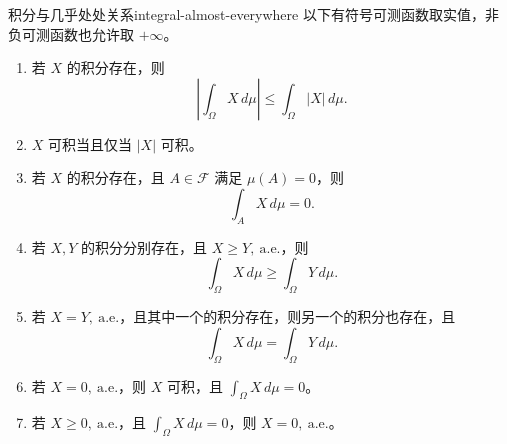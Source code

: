 \begin{proposition}{积分与几乎处处关系}{integral-almost-everywhere}
以下有符号可测函数取实值，非负可测函数也允许取 $+\infty$。
\begin{enumerate}
\item 若 $X$ 的积分存在，则
\[
\left|\int_\Omega X\,d\mu\right|
\leq\int_\Omega|X|\,d\mu.
\]
\item $X$ 可积当且仅当 $|X|$ 可积。
\item 若 $X$ 的积分存在，且 $A\in\mathcal F$ 满足 $\mu(A)=0$，则
\[
\int_A X\,d\mu=0.
\]
\item 若 $X,Y$ 的积分分别存在，且 $X\geq Y,\ \mathrm{a.e.}$，则
\[
\int_\Omega X\,d\mu\geq\int_\Omega Y\,d\mu.
\]
\item 若 $X=Y,\ \mathrm{a.e.}$，且其中一个的积分存在，则另一个的积分也存在，且
\[
\int_\Omega X\,d\mu=\int_\Omega Y\,d\mu.
\]
\item 若 $X=0,\ \mathrm{a.e.}$，则 $X$ 可积，且 $\displaystyle\int_\Omega X\,d\mu=0$。
\item 若 $X\geq0,\ \mathrm{a.e.}$，且 $\displaystyle\int_\Omega X\,d\mu=0$，则 $X=0,\ \mathrm{a.e.}$。
\end{enumerate}
\end{proposition}

